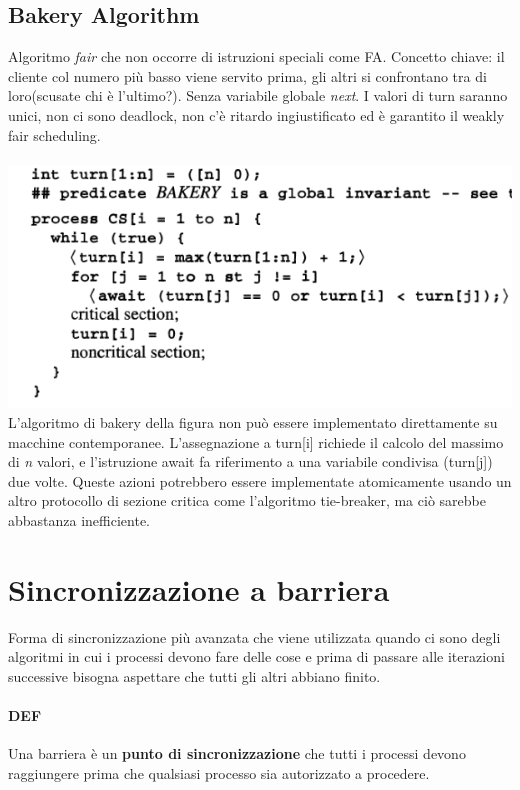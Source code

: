 \documentclass[10pt,a4paper]{book}
\begin{document}
\subsection{Bakery Algorithm}
Algoritmo \textit{fair} che non occorre di istruzioni speciali come FA.
Concetto chiave: il cliente col numero più basso viene servito prima, gli altri si confrontano tra di loro(scusate chi è l'ultimo?). Senza variabile globale \textit{next}.
I valori di turn saranno unici, non ci sono deadlock, non c'è ritardo ingiustificato ed è garantito il weakly fair scheduling. \\ \\
\includegraphics[scale=0.4]{img/bakery.png} \\
L'algoritmo di bakery della figura non può essere implementato direttamente su macchine contemporanee. L'assegnazione a turn[i] richiede il calcolo del massimo di \textit{n} valori, e l'istruzione await fa riferimento a una variabile condivisa (turn[j]) due volte. Queste azioni potrebbero essere implementate atomicamente usando un altro protocollo di sezione critica come l'algoritmo tie-breaker, ma ciò sarebbe abbastanza inefficiente.




\section{Sincronizzazione a barriera}
Forma di sincronizzazione più avanzata che viene utilizzata quando ci sono degli algoritmi in cui i processi devono fare delle cose e prima di passare alle iterazioni successive bisogna aspettare che tutti gli altri abbiano finito.
\paragraph{DEF} Una barriera è un \textbf{punto di sincronizzazione} che tutti i processi devono raggiungere prima che qualsiasi processo sia autorizzato a procedere.
\end{document}
